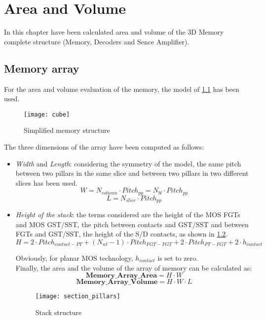 \chapter{Area and Volume}
\graphicspath{{foto/Chap4/}}
In this chapter have been calculated area and volume of the 3D Memory complete structure (Memory, Decoders and Sence Amplifier).

\section{Memory array}
For the area and volume evaluation of the memory, the model of \ref{fig:cube} has been used.

\begin{center}
	\begin{figure}[H]
		\centering
		\texttt{[image: cube]}
		\caption{Simplified memory structure}
		\label{fig:cube}
	\end{figure}
\end{center}

The three dimensions of the array have been computed as follows:

\begin{itemize}
	\item \textit{Width} and \textit{Length}: considering the symmetry of the model, the same pitch between two pillars in the same slice and between two pillars in two different slices has been used.
	\[
	W=N_{column} \cdot Pitch_{pp} = N_{bl} \cdot Pitch_{pp}
	\]	
	\[
	L=N_{slice} \cdot Pitch_{pp}
	\]
				
	\item \textit{Height of the stack}: the terms considered are the height of the MOS FGTs and MOS GST/SST, the pitch between contacts and GST/SST and between FGTs and GST/SST, the height of the S/D contacts, as shown in \ref{fig:pillar}.	
	\[
	H=2 \cdot Pitch_{contact-PT}+(N_{wl}-1) \cdot Pitch_{FGT-FGT}+2 \cdot Pitch_{PT-FGT}+ 2 \cdot h_{contact}
	\]

	Obviously, for planar MOS technology, $h_{contact}$ is set to zero.\\ 
	Finally, the area and the volume of the array of memory can be calculated as:
	\[
	\textbf{Memory\_Array\_Area}=H \cdot W
	\]
	\[
	\textbf{Memory\_Array\_Volume}=H \cdot W \cdot L
	\]

\begin{center}
	\begin{figure}[H]
		\centering
		\texttt{[image: section\_pillars]}
		\caption{Stack structure}
		\label{fig:pillar}
	\end{figure}
\end{center}
\end{itemize}

